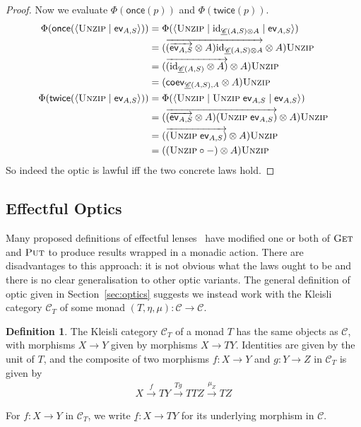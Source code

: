 \documentclass[11pt,letterpaper]{article}
\theoremstyle{plain}
\theoremstyle{definition}
\newtheorem{definition}[theorem]{Definition}
\newcommand{\C}{\mathscr{C}}
\newcommand{\homC}{\underline{\C}}
\newcommand{\id}{\mathrm{id}}
\newcommand{\rep}[2]{{\ensuremath \left\langle #1 \mid #2 \right\rangle}}
\newcommand{\repthree}[3]{{\ensuremath \langle #1 \mid #2 \mid #3 \rangle}}
\newcommand{\fget}{\textsc{Get}}
\newcommand{\fput}{\textsc{Put}}
\newcommand{\funzip}{\textsc{Unzip}}
\newcommand{\once}{\mathsf{once}}
\newcommand{\twice}{\mathsf{twice}}
\begin{document}
\begin{proof}
  Now we evaluate $\Phi(\once(p))$ and $\Phi(\twice(p))$.
  \begin{align*}
    \Phi(\once(\rep{\funzip}{\ev_{A, S}}))
    &= \Phi(\repthree{\funzip}{\id_{\homC(A,S) \otimes A}}{\ev_{A, S} }) \\
    &= (\overrightarrow{(\overrightarrow{\ev_{A, S}} \otimes A)\id_{\homC(A,S) \otimes A}} \otimes A)\funzip \\
    &= (\overrightarrow{(\id_{\homC(A, S)} \otimes A)} \otimes A)\funzip \\
    &= (\coev_{\homC(A, S), A} \otimes A)\funzip \\
    \Phi(\twice(\rep{\funzip}{\ev_{A, S} }))
    &= \Phi(\repthree{\funzip}{\funzip \; \ev_{A, S}}{\ev_{A, S} }) \\
    &= (\overrightarrow{(\overrightarrow{\ev_{A, S}} \otimes A)(\funzip \; \ev_{A, S})} \otimes A)\funzip \\
    &= (\overrightarrow{(\funzip \; \ev_{A, S})} \otimes A)\funzip \\
    &= ((\funzip \circ -) \otimes A)\funzip
  \end{align*}
  So indeed the optic is lawful iff the two concrete laws hold.
\end{proof}

\subsection{Effectful Optics}
\newcommand{\monact}{\rtimes}

Many proposed definitions of effectful lenses~\cite{ReflectionsOnMonadicLenses} have modified one or both of $\fget$ and $\fput$ to produce results wrapped in a monadic action. There are disadvantages to this approach: it is not obvious what the laws ought to be and there is no clear generalisation to other optic variants. The general definition of optic given in Section~\ref{sec:optics} suggests we instead work with the Kleisli category $\C_T$ of some monad $(T, \eta, \mu) : \C \to \C$.

\begin{definition}
The Kleisli category $\C_T$ of a monad $T$ has the same objects as $\C$, with morphisms $X \to Y$ given by morphisms $X \to TY$. Identities are given by the unit of $T$, and the composite of two morphisms $f : X \to Y$ and $g : Y \to Z$ in $\C_T$ is given by
\begin{align*}
X \xrightarrow{f} TY \xrightarrow{Tg} TTZ \xrightarrow{\mu_Z} TZ
\end{align*}

For $f : X \to Y$ in $\C_T$, we write $\underline{f} : X \to TY$ for its underlying morphism in $\C$.
\end{definition}
\end{document}
